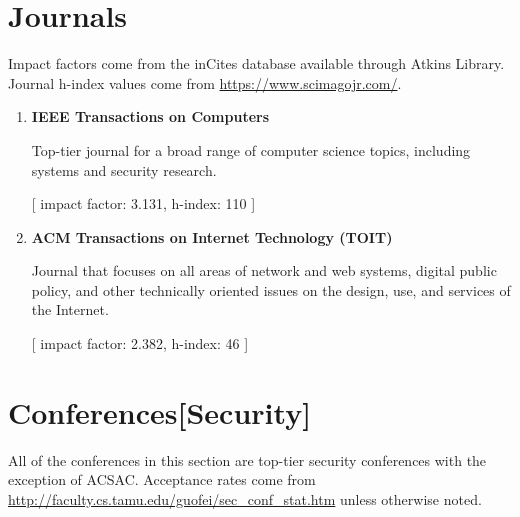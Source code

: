 \newpage
\setcounter{page}{1}

\section*{Journals}
Impact factors come from the inCites database available through Atkins Library. Journal h-index values come from \url{https://www.scimagojr.com/}.
\begin{enumerate}
\tightlist
\item \textbf{IEEE Transactions on Computers}

Top-tier journal for a broad range of computer science topics, including systems and security research.

[ impact factor: 3.131, h-index: 110 ]

\item \textbf{ACM Transactions on Internet Technology (TOIT)}

Journal that focuses on all areas of network and web systems, digital public policy, and other technically oriented issues on the design, use, and services of the Internet.

[ impact factor: 2.382, h-index: 46 ]

\end{enumerate}

\section*{Conferences[Security]}
All of the conferences in this section are top-tier security conferences with the exception of ACSAC. Acceptance rates come from \url{http://faculty.cs.tamu.edu/guofei/sec_conf_stat.htm} unless otherwise noted.

